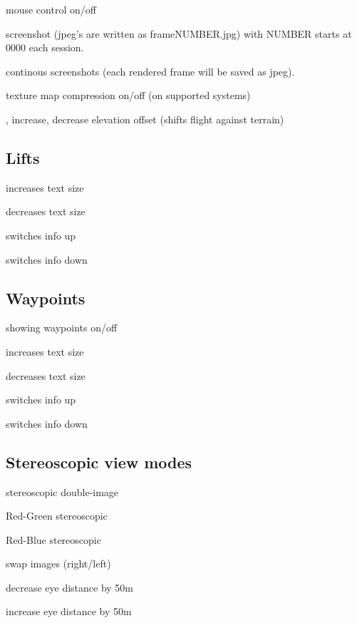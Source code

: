 \begin{hkkeys}
\item[\keys{m}]        mouse control on/off
\item[\keys{p}]        screenshot (jpeg's are written as frameNUMBER.jpg)
        with NUMBER starts at 0000 each session.

\item[\keys{P}]        continous screenshots
        (each rendered frame will be saved as jpeg).

\item[\keys{y}]        texture map compression on/off (on supported systems)

\item[\keys{u}, \keys{i}]      increase, decrease elevation offset
        (shifts flight against terrain)
\end{hkkeys}


\subsection*{Lifts}
\begin{hkkeys}
\item[\keys{\shift+page-up}] increases text size
\item[\keys{\shift+page-down}] decreases text size
\item[\keys{Pos1}] switches info up
\item[\keys{End}] switches info down
\end{hkkeys}

\subsection*{Waypoints}
\begin{hkkeys}
\item[\keys{F12}] showing waypoints on/off
\item[\keys{\shift+page-up}] increases text size
\item[\keys{\shift+page-down}] decreases text size
\item[\keys{\shift+Pos1}] switches info up
\item[\keys{\shift+End}] switches info down
\end{hkkeys}


\subsection*{Stereoscopic view modes}

\begin{hkkeys}
\item[\keys{S}]        stereoscopic double-image
\item[\keys{D}]        Red-Green stereoscopic
\item[\keys{F}]        Red-Blue stereoscopic
\item[\keys{A}]        swap images (right/left)
\item[\keys{Q}]        decrease eye distance by 50m
\item[\keys{W}]        increase eye distance by 50m
\end{hkkeys}
